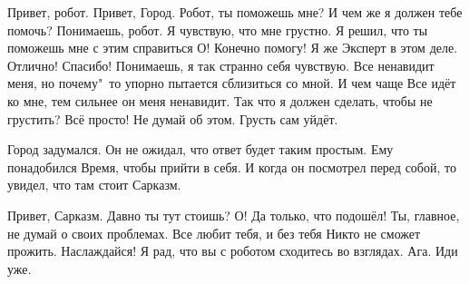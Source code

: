 \begin{dialog}
\X Привет, робот.
\R Привет, Город.
\X Робот, ты поможешь мне?
\R И чем же я должен тебе помочь?
\X Понимаешь, робот. Я чувствую, что мне грустно. Я решил, что ты поможешь мне с этим справиться
\R О! Конечно помогу! Я же Эксперт в этом деле.
\X Отлично! Спасибо! Понимаешь, я так странно себя чувствую. Все ненавидит меня, но почему"~то упорно пытается сблизиться со мной. И чем чаще Все идёт ко мне, тем сильнее он меня ненавидит. Так что я должен сделать, чтобы не грустить?
\R Всё просто! Не думай об этом. Грусть сам уйдёт.
\end{dialog}

\begin{monolog}
Город задумался. Он не ожидал, что ответ будет таким простым. Ему понадобился Время, чтобы прийти в себя. И когда он посмотрел перед собой, то увидел, что там стоит Сарказм.
\end{monolog}

\begin{dialog}
\Y Привет, Сарказм. Давно ты тут стоишь?
\X О! Да только, что подошёл! Ты, главное, не думай о своих проблемах. Все любит тебя, и без тебя Никто не сможет прожить. Наслаждайся!
\Y Я рад, что вы с роботом сходитесь во взглядах.
\X Ага. Иди уже.
\end{dialog}